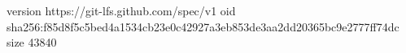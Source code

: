 version https://git-lfs.github.com/spec/v1
oid sha256:f85d8f5c5bed4a1534cb23e0c42927a3eb853de3aa2dd20365bc9e2777ff74dc
size 43840
